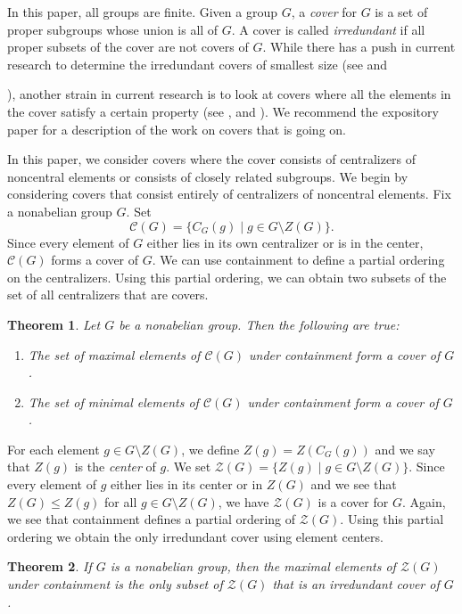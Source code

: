 \documentclass[12pt]{amsart}
\newtheorem{thm}{Theorem}
\begin{document}
In this paper, all groups are finite.  Given a group $G$, a {\it cover} for $G$ is a set of proper subgroups whose union is all of $G$.  A cover is called {\it irredundant} if all proper subsets of the cover are not covers of $G$.  While there has a push in current research to determine the irredundant covers of smallest size (see \cite{Gar} and {\cite{GKS}), another strain in current research is to look at covers where all the elements in the cover satisfy a certain property (see \cite{barg}, \cite{mason} and \cite{sun}).  We recommend the expository paper \cite{cover-exp} for a description of the work on covers that is going on.  

In this paper, we consider covers where the cover consists of centralizers of noncentral elements or consists of closely related subgroups.  We begin by considering covers that consist entirely of centralizers of noncentral elements.  Fix a nonabelian group $G$.  Set 
$$\mathcal {C} (G) = \{ C_G (g) \mid g \in G \setminus Z(G) \}.$$  
Since every element of $G$ either lies in its own centralizer or is in the center, $\mathcal{C} (G)$ forms a cover of $G$.  We can use containment to define a partial ordering on the centralizers.  Using this partial ordering, we can obtain two subsets of the set of all centralizers that are covers.

\begin{thm}\label{Intro thm 1}
Let $G$ be a nonabelian group.  Then the following are true:
\begin{enumerate}
\item The set of maximal elements of $\mathcal {C} (G)$ under containment form a cover of $G$.
\item The set of minimal elements of $\mathcal {C} (G)$ under containment form a cover of $G$.
\end{enumerate}
\end{thm}

For each element $g \in G \setminus Z(G)$, we define $Z(g) = Z (C_G (g))$ and we say that $Z (g)$ is the {\it center} of $g$.  We set $\mathcal{Z} (G) = \{ Z(g) \mid g \in G \setminus Z (G) \}$.  Since every element of $g$ either lies in its center or in $Z (G)$ and we see that $Z(G) \le Z(g)$  for all $g \in G \setminus Z(G)$, we have $\mathcal{Z} (G)$ is a cover for $G$. Again, we see that containment defines a partial ordering of $\mathcal{Z} (G)$.   Using this partial ordering we obtain the only irredundant cover using element centers.

\begin{thm}\label{Intro thm 2}
If $G$ is a nonabelian group, then the maximal elements of $\mathcal{Z} (G)$ under containment is the only subset of $\mathcal{Z} (G)$ that is an irredundant cover of $G$.     
\end{thm}

}
\end{document}
